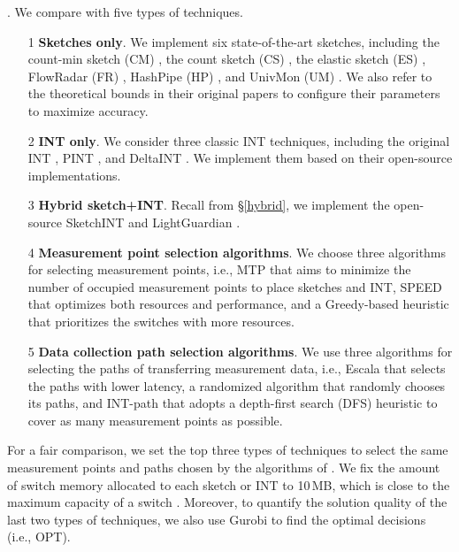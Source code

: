 . We compare \sysname with five types of techniques. 

\begin{itemize}[leftmargin=*]
%
    \item[1] \textbf{Sketches only}. We implement six state-of-the-art sketches, including the count-min sketch (CM) \cite{cormode2005improved}, the count sketch (CS) \cite{charikar2004finding}, the elastic sketch (ES) \cite{yang2018elastic}, FlowRadar (FR) \cite{li2016flowradar}, HashPipe (HP) \cite{sivaraman2017heavy}, and UnivMon (UM) \cite{liu2016one}. We also refer to the theoretical bounds in their original papers to configure their parameters to maximize accuracy. %
%
    \item[2] \textbf{INT only}. We consider three classic INT techniques, including the original INT \cite{int}, PINT \cite{ben2020pint}, and DeltaINT \cite{sheng2021deltaint}. We implement them based on their open-source implementations. %
%
    \item[3] \textbf{Hybrid sketch+INT}. Recall from \S\ref{hybrid}, we implement the open-source SketchINT \cite{yang2023sketchint} and LightGuardian \cite{zhao2021lightguardian}. 
%
    \item[4] \textbf{Measurement point selection algorithms}. We choose three algorithms for selecting measurement points, i.e., MTP \cite{chen2021mtp} that aims to minimize the number of occupied measurement points to place sketches and INT, SPEED \cite{chen2020speed} that optimizes both resources and performance, and a Greedy-based heuristic that prioritizes the switches with more resources. 
%
    \item[5] \textbf{Data collection path selection algorithms}. We use three algorithms for selecting the paths of transferring measurement data, i.e., Escala \cite{liu2022escala} that selects the paths with lower latency, a randomized algorithm that randomly chooses its paths, and INT-path \cite{pan2019int} that adopts a depth-first search (DFS) heuristic to cover as many measurement points as possible.
%
\end{itemize}

For a fair comparison, we set the top three types of techniques to select the same measurement points and paths chosen by the algorithms of \sysname. We fix the amount of switch memory allocated to each sketch or INT to 10\,MB, which is close to the maximum capacity of a switch \cite{gupta2018sonata}. 
Moreover, to quantify the solution quality of the last two types of techniques, we also use Gurobi \cite{gurobi} to find the optimal decisions (i.e., OPT). 

